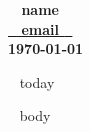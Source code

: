 \documentclass[11pt,english]{article}
\begin{document}

\begin{center}
\huge\bf\color{maincolor} ~{{ name }}~ \\
\small\color{black} \href{mailto: ~{{ email }}~ }{ ~{{ email }}~ } \\
\small \today
\end{center}

\begin{flushright}
\vspace{3.5mm}
\tiny ~{{ today }}~
\end{flushright}

\vspace{-18mm}

~{{ body }}~
\end{document}
